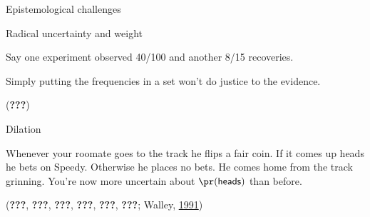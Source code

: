 \documentclass[10pt,ignorenonframetext,x11names, dvipsnames, bibspacing,natbib]{beamer}
\begin{document}
\begin{frame}{Epistemological challenges}

\pause

\begin{block}{Radical uncertainty and weight}

Say one experiment observed 40/100 and another 8/15 recoveries.

Simply putting the frequencies in a set won't do justice to the
evidence.

\scriptsize  \vspace{1mm}

({\textbf{???}})

\pause

\end{block}

\begin{block}{Dilation}

\justify Whenever your roomate goes to the track he flips a fair coin.
If it comes up heads he bets on Speedy. Otherwise he places no bets. He
comes home from the track grinning. You're now more uncertain about
\(\pr(\mathsf{heads})\) than before.

\scriptsize 

\vspace{1mm} ({\textbf{???}}, {\textbf{???}}, {\textbf{???}},
{\textbf{???}}, {\textbf{???}}, {\textbf{???}}; Walley,
\protect\hyperlink{ref-walley1991statistical}{1991})

\end{block}

\end{frame}
\end{document}

